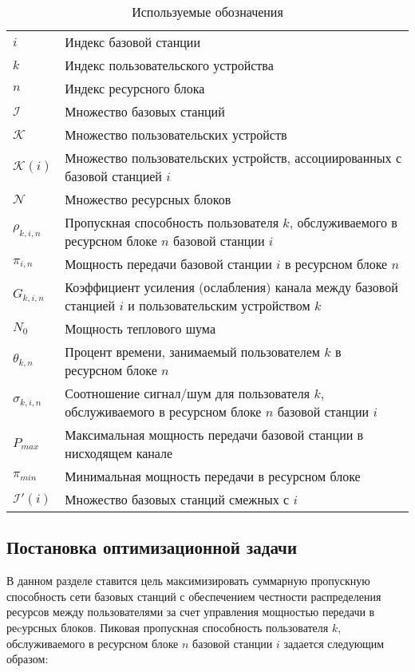 \begin{table} [htbp]
  \label{tbl:notations}
  \centering
  \caption{Используемые обозначения}\label{Ts0Sib}%
  \begin{tabular}{| p{1cm} || p{10cm} |}
  \hline
  \hline
  \centering $i$ &  Индекс базовой станции   						\\
  \centering $k$ &  Индекс пользовательского устройства     		\\
  \centering $n$ &  Индекс ресурсного блока   						\\
  \centering $\mathcal{I}$ & Множество базовых станций				\\
  \centering $\mathcal{K}$ & Множество пользовательских устройств	\\
  \centering $\mathcal{K}(i)$ & Множество пользовательских устройств, ассоциированных с базовой станцией $i$\\
  \centering $\mathcal{N}$ & Множество ресурсных блоков\\
  \centering $\rho_{k,i,n}$ & Пропускная способность пользователя $k$, обслуживаемого в ресурсном блоке $n$ базовой станции $i$\\
  \centering $\pi_{i,n}$ & Мощность передачи базовой станции $i$ в ресурсном блоке $n$\\
  \centering $G_{k,i,n}$ & Коэффициент усиления (ослабления) канала между базовой станцией $i$ и пользовательским устройством $k$\\
  \centering $N_0$ & Мощность теплового шума\\
  \centering $\theta_{k,n}$ & Процент времени, занимаемый пользователем $k$ в ресурсном блоке $n$ \\
  \centering $\sigma_{k,i,n}$ & Соотношение сигнал/шум для пользователя $k$, обслуживаемого в ресурсном блоке $n$ базовой станции $i$ \\
  \centering $P_{max}$ &  Максимальная мощность передачи базовой станции в  нисходящем канале\\
  \centering $\pi_{min}$ & Минимальная мощность передачи в ресурсном блоке \\
  \centering $\mathcal{I}'(i)$ & Множество базовых станций смежных с $i$\\
  \hline
  \hline
  \end{tabular}
\end{table}

\subsection{Постановка оптимизационной задачи}
В данном разделе ставится цель максимизировать суммарную пропускную способность сети базовых станций с обеспечением честности распределения ресурсов между пользователями за счет управления мощностью передачи в реcурсных блоков. Пиковая пропускная способность пользователя $k$, обслуживаемого в ресурсном блоке $n$ базовой станции $i$ задается следующим образом:

